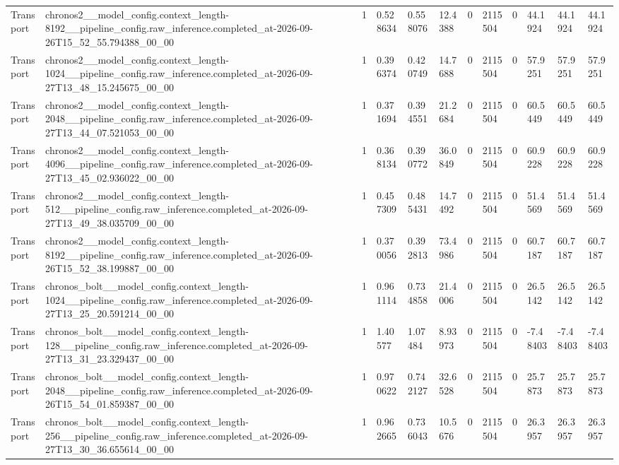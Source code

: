 \begin{tabular}{llllllllllll}
Transport & chronos2\_\_model\_config.context\_length-8192\_\_pipeline\_config.raw\_inference.completed\_at-2026-09-26T15\_52\_55.794388\_00\_00 & 1 & 0.528634 & 0.558076 & 12.4388 & 0 & 2115504 & 0 & 44.1924 & 44.1924 & 44.1924 \\
Transport & chronos2\_\_model\_config.context\_length-1024\_\_pipeline\_config.raw\_inference.completed\_at-2026-09-27T13\_48\_15.245675\_00\_00 & 1 & 0.396374 & 0.420749 & 14.7688 & 0 & 2115504 & 0 & 57.9251 & 57.9251 & 57.9251 \\
Transport & chronos2\_\_model\_config.context\_length-2048\_\_pipeline\_config.raw\_inference.completed\_at-2026-09-27T13\_44\_07.521053\_00\_00 & 1 & 0.371694 & 0.394551 & 21.2684 & 0 & 2115504 & 0 & 60.5449 & 60.5449 & 60.5449 \\
Transport & chronos2\_\_model\_config.context\_length-4096\_\_pipeline\_config.raw\_inference.completed\_at-2026-09-27T13\_45\_02.936022\_00\_00 & 1 & 0.368134 & 0.390772 & 36.0849 & 0 & 2115504 & 0 & 60.9228 & 60.9228 & 60.9228 \\
Transport & chronos2\_\_model\_config.context\_length-512\_\_pipeline\_config.raw\_inference.completed\_at-2026-09-27T13\_49\_38.035709\_00\_00 & 1 & 0.457309 & 0.485431 & 14.7492 & 0 & 2115504 & 0 & 51.4569 & 51.4569 & 51.4569 \\
Transport & chronos2\_\_model\_config.context\_length-8192\_\_pipeline\_config.raw\_inference.completed\_at-2026-09-26T15\_52\_38.199887\_00\_00 & 1 & 0.370056 & 0.392813 & 73.4986 & 0 & 2115504 & 0 & 60.7187 & 60.7187 & 60.7187 \\
Transport & chronos\_bolt\_\_model\_config.context\_length-1024\_\_pipeline\_config.raw\_inference.completed\_at-2026-09-27T13\_25\_20.591214\_00\_00 & 1 & 0.961114 & 0.734858 & 21.4006 & 0 & 2115504 & 0 & 26.5142 & 26.5142 & 26.5142 \\
Transport & chronos\_bolt\_\_model\_config.context\_length-128\_\_pipeline\_config.raw\_inference.completed\_at-2026-09-27T13\_31\_23.329437\_00\_00 & 1 & 1.40577 & 1.07484 & 8.93973 & 0 & 2115504 & 0 & -7.48403 & -7.48403 & -7.48403 \\
Transport & chronos\_bolt\_\_model\_config.context\_length-2048\_\_pipeline\_config.raw\_inference.completed\_at-2026-09-26T15\_54\_01.859387\_00\_00 & 1 & 0.970622 & 0.742127 & 32.6528 & 0 & 2115504 & 0 & 25.7873 & 25.7873 & 25.7873 \\
Transport & chronos\_bolt\_\_model\_config.context\_length-256\_\_pipeline\_config.raw\_inference.completed\_at-2026-09-27T13\_30\_36.655614\_00\_00 & 1 & 0.962665 & 0.736043 & 10.5676 & 0 & 2115504 & 0 & 26.3957 & 26.3957 & 26.3957 \\

\end{tabular}
